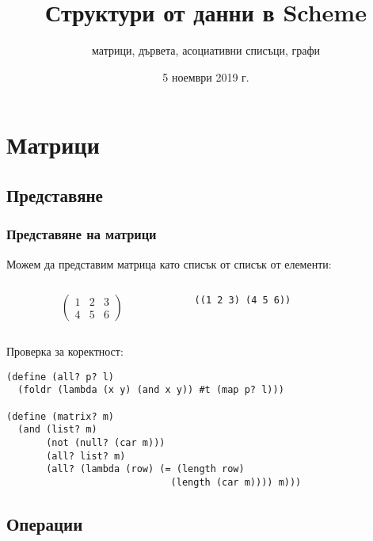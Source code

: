 \documentclass[alsotrans]{beamerswitch}
\title{Структури от данни в Scheme}
\subtitle{матрици, дървета, асоциативни списъци, графи}
\date{5 ноември 2019 г.}
\begin{document}
\begin{frame}
  \titlepage
\end{frame}

\section{Матрици}

\subsection{Представяне}

\begin{frame}[fragile]
  \frametitle{Представяне на матрици}
  Можем да представим матрица като списък от списък от елементи:\\
  \begin{columns}[T,onlytextwidth]
    \begin{column}{0.5\textwidth}
      \begin{equation*}
        \left(
          \begin{array}{ccc}
            1 & 2 & 3\\
            4 & 5 & 6
          \end{array}
        \right)
      \end{equation*}
    \end{column}
    \begin{column}{0.5\textwidth}
      \vspace{2ex}
      \tt{((1 2 3) (4 5 6))}
    \end{column}
  \end{columns}
  \vspace{2ex}
  \pause
  Проверка за коректност:
  \pause
\begin{lstlisting}
(define (all? p? l)
  (foldr (lambda (x y) (and x y)) #t (map p? l)))

(define (matrix? m)
  (and (list? m)
       (not (null? (car m)))
       (all? list? m)
       (all? (lambda (row) (= (length row)
                             (length (car m)))) m)))
\end{lstlisting}
\end{frame}

\subsection{Операции}
\end{document}
